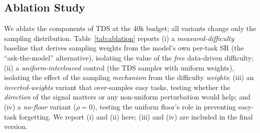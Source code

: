 \documentclass[letterpaper]{article} %
\newcommand{\tds}{TDS}
\begin{document}
\subsection{Ablation Study}
We ablate the components of \tds{} at the $40$k budget; all variants change only the sampling distribution. Table~\ref{tab:ablation} reports (i) a \emph{measured-difficulty} baseline that derives sampling weights from the model's own per-task SR (the ``ask-the-model'' alternative), isolating the value of the \emph{free} data-driven difficulty; (ii) a \emph{uniform-interleaved} control (the \tds{} sampler with uniform weights), isolating the effect of the sampling \emph{mechanism} from the difficulty \emph{weights}; (iii) an \emph{inverted-weights} variant that over-samples easy tasks, testing whether the \emph{direction} of the signal matters or any non-uniform perturbation would help; and (iv) a \emph{no-floor} variant ($\rho{=}0$), testing the uniform floor's role in preventing easy-task forgetting. We report (i) and (ii) here; (iii) and (iv) are included in the final version.
\end{document}
